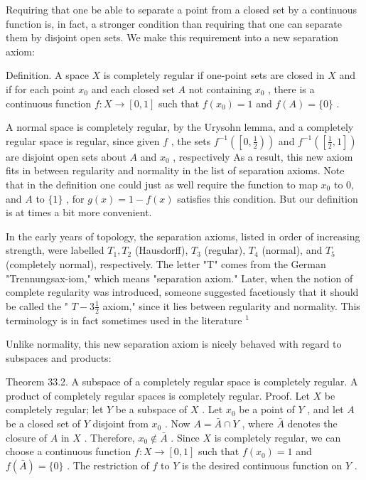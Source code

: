 Requiring that one be able to separate a point from a closed set by a continuous function is, in fact, a stronger condition than requiring that one can separate them by disjoint open sets. We make this requirement into a new separation axiom:

Definition. A space \(X\) is completely regular if one-point sets are closed in \(X\) and if for each point \({x}_{0}\) and each closed set \(A\) not containing \({x}_{0}\) , there is a continuous function \(f : X \rightarrow  \left\lbrack  {0,1}\right\rbrack\) such that \(f\left( {x}_{0}\right)  = 1\) and \(f\left( A\right)  = \{ 0\}\) .

A normal space is completely regular, by the Urysohn lemma, and a completely regular space is regular, since given \(f\) , the sets \({f}^{-1}\left( \left\lbrack  {0,\frac{1}{2}}\right) \right)\) and \({f}^{-1}\left( \left\lbrack  {\frac{1}{2},1}\right\rbrack  \right)\) are disjoint open sets about \(A\) and \({x}_{0}\) , respectively As a result, this new axiom fits in between regularity and normality in the list of separation axioms. Note that in the definition one could just as well require the function to map \({x}_{0}\) to 0, and \(A\) to \(\{ 1\}\) , for \(g\left( x\right)  = 1 - f\left( x\right)\) satisfies this condition. But our definition is at times a bit more convenient.

In the early years of topology, the separation axioms, listed in order of increasing strength, were labelled \({T}_{1},{T}_{2}\) (Hausdorff), \({T}_{3}\) (regular), \({T}_{4}\) (normal), and \({T}_{5}\) (completely normal), respectively. The letter "T" comes from the German "Trennungsax-iom," which means "separation axiom." Later, when the notion of complete regularity was introduced, someone suggested facetiously that it should be called the " \(T - 3\frac{1}{2}\) axiom," since it lies between regularity and normality. This terminology is in fact sometimes used in the literature \({}^{1}\)

Unlike normality, this new separation axiom is nicely behaved with regard to subspaces and products:

Theorem 33.2. A subspace of a completely regular space is completely regular. A product of completely regular spaces is completely regular. Proof. Let \(X\) be completely regular; let \(Y\) be a subspace of \(X\) . Let \({x}_{0}\) be a point of \(Y\) , and let \(A\) be a closed set of \(Y\) disjoint from \({x}_{0}\) . Now \(A = \bar{A} \cap  Y\) , where \(\bar{A}\) denotes the closure of \(A\) in \(X\) . Therefore, \({x}_{0} \notin  \bar{A}\) . Since \(X\) is completely regular, we can choose a continuous function \(f : X \rightarrow  \left\lbrack  {0,1}\right\rbrack\) such that \(f\left( {x}_{0}\right)  = 1\) and \(f\left( \bar{A}\right)  = \{ 0\}\) . The restriction of \(f\) to \(Y\) is the desired continuous function on \(Y\) .

